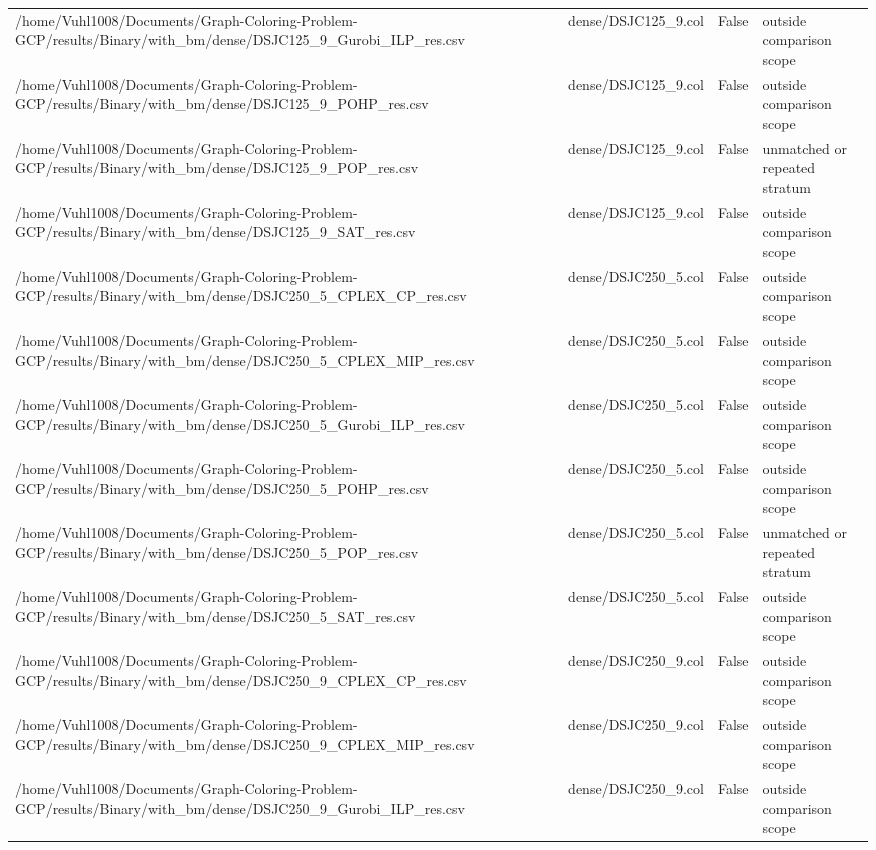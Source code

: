 \begin{table}[htbp]
\begin{tabular}{llll}
/home/Vuhl1008/Documents/Graph-Coloring-Problem-GCP/results/Binary/with\_bm/dense/DSJC125\_9\_Gurobi\_ILP\_res.csv & dense/DSJC125\_9.col & False & outside comparison scope \\
/home/Vuhl1008/Documents/Graph-Coloring-Problem-GCP/results/Binary/with\_bm/dense/DSJC125\_9\_POHP\_res.csv & dense/DSJC125\_9.col & False & outside comparison scope \\
/home/Vuhl1008/Documents/Graph-Coloring-Problem-GCP/results/Binary/with\_bm/dense/DSJC125\_9\_POP\_res.csv & dense/DSJC125\_9.col & False & unmatched or repeated stratum \\
/home/Vuhl1008/Documents/Graph-Coloring-Problem-GCP/results/Binary/with\_bm/dense/DSJC125\_9\_SAT\_res.csv & dense/DSJC125\_9.col & False & outside comparison scope \\
/home/Vuhl1008/Documents/Graph-Coloring-Problem-GCP/results/Binary/with\_bm/dense/DSJC250\_5\_CPLEX\_CP\_res.csv & dense/DSJC250\_5.col & False & outside comparison scope \\
/home/Vuhl1008/Documents/Graph-Coloring-Problem-GCP/results/Binary/with\_bm/dense/DSJC250\_5\_CPLEX\_MIP\_res.csv & dense/DSJC250\_5.col & False & outside comparison scope \\
/home/Vuhl1008/Documents/Graph-Coloring-Problem-GCP/results/Binary/with\_bm/dense/DSJC250\_5\_Gurobi\_ILP\_res.csv & dense/DSJC250\_5.col & False & outside comparison scope \\
/home/Vuhl1008/Documents/Graph-Coloring-Problem-GCP/results/Binary/with\_bm/dense/DSJC250\_5\_POHP\_res.csv & dense/DSJC250\_5.col & False & outside comparison scope \\
/home/Vuhl1008/Documents/Graph-Coloring-Problem-GCP/results/Binary/with\_bm/dense/DSJC250\_5\_POP\_res.csv & dense/DSJC250\_5.col & False & unmatched or repeated stratum \\
/home/Vuhl1008/Documents/Graph-Coloring-Problem-GCP/results/Binary/with\_bm/dense/DSJC250\_5\_SAT\_res.csv & dense/DSJC250\_5.col & False & outside comparison scope \\
/home/Vuhl1008/Documents/Graph-Coloring-Problem-GCP/results/Binary/with\_bm/dense/DSJC250\_9\_CPLEX\_CP\_res.csv & dense/DSJC250\_9.col & False & outside comparison scope \\
/home/Vuhl1008/Documents/Graph-Coloring-Problem-GCP/results/Binary/with\_bm/dense/DSJC250\_9\_CPLEX\_MIP\_res.csv & dense/DSJC250\_9.col & False & outside comparison scope \\
/home/Vuhl1008/Documents/Graph-Coloring-Problem-GCP/results/Binary/with\_bm/dense/DSJC250\_9\_Gurobi\_ILP\_res.csv & dense/DSJC250\_9.col & False & outside comparison scope \\

\end{tabular}
\end{table}
